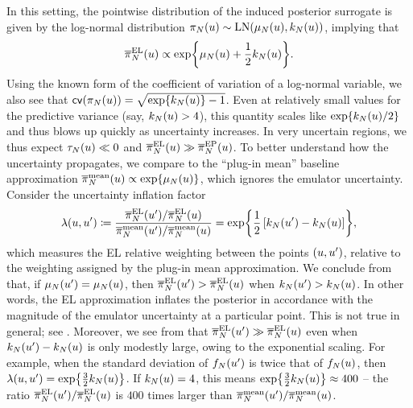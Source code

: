 \documentclass[12pt]{article}
\begin{document}
In this setting, the pointwise distribution of the induced posterior surrogate is given by the log-normal 
distribution $\pi_{N}(u) \sim \mathrm{LN}(\mu_{N}(u), k_{N}(u))$, implying that
\begin{equation}
\overline{\pi}_{N}^{\mathrm{EL}}(u) \propto \exp\mathopen{}\left\{\mu_{N}(u) + \frac{1}{2}k_{N}(u)\right\}\mathclose{}.
\label{eq:EL-Gaussian-fwd}
\end{equation} 
Using the known form of the coefficient of variation of a log-normal variable, we also see that
$\mathsf{cv}(\pi_{N}(u)) = \sqrt{\exp\mathopen{}\left\{k_{N}(u)\right\}\mathclose{} - 1}$. Even at relatively small values for the 
predictive variance (say, $k_{N}(u) > 4$), this quantity scales like $\exp\mathopen{}\left\{k_{N}(u)/2\right\}\mathclose{}$
and thus blows up quickly as uncertainty increases. In very uncertain regions, we thus expect
$\tau_{N}(u) \ll 0$ and $\overline{\pi}_{N}^{\mathrm{EL}}(u) \gg \overline{\pi}_{N}^{\mathrm{EP}}(u)$.
To better understand how the uncertainty propagates, we compare to the ``plug-in mean''
 baseline approximation $\overline{\pi}_{N}^{\mathrm{mean}}(u) \propto \exp\mathopen{}\left\{\mu_{N}(u)\right\}\mathclose{}$, 
 which ignores the emulator uncertainty. Consider the uncertainty inflation factor
 \begin{equation}
 \lambda(u, u^\prime) 
 \coloneqq \frac{\overline{\pi}_{N}^{\mathrm{EL}}(u^\prime)/\overline{\pi}_{N}^{\mathrm{EL}}(u)}{\overline{\pi}_{N}^{\mathrm{mean}}(u^\prime)/\overline{\pi}_{N}^{\mathrm{mean}}(u)}
 = \exp\mathopen{}\left\{\frac{1}{2}\left[k_{N}(u^\prime) - k_{N}(u) \right]\right\}\mathclose{},
 \label{eq:unc-infl-factor}
 \end{equation}
which measures the EL relative weighting between the points $(u, u^\prime)$, relative to the 
weighting assigned by the plug-in mean approximation. We conclude from 
that, if $\mu_{N}(u^\prime) = \mu_{N}(u)$, then $\overline{\pi}_{N}^{\mathrm{EL}}(u^\prime) > \overline{\pi}_{N}^{\mathrm{EL}}(u)$
when $k_{N}(u^\prime) > k_{N}(u)$. In other words, the EL approximation inflates the posterior
in accordance with the magnitude of the emulator uncertainty at a particular point. 
This is not true in general; see . Moreover, we see from  that
$\overline{\pi}_{N}^{\mathrm{EL}}(u^\prime) \gg \overline{\pi}_{N}^{\mathrm{EL}}(u)$ even when 
$k_{N}(u^\prime) - k_{N}(u)$ is only modestly large, owing to the exponential scaling. 
For example, when the standard deviation of $f_{N}(u^\prime)$ is twice that of $f_{N}(u)$,
then $\lambda(u, u^\prime) = \exp\mathopen{}\left\{\frac{3}{2}k_{N}(u)\right\}\mathclose{}$. If $k_{N}(u) = 4$, this means
$\exp\mathopen{}\left\{\frac{3}{2}k_{N}(u)\right\}\mathclose{} \approx 400$ -- the ratio $\overline{\pi}_{N}^{\mathrm{EL}}(u^\prime)/\overline{\pi}_{N}^{\mathrm{EL}}(u)$
is $400$ times larger than $\overline{\pi}_{N}^{\mathrm{mean}}(u^\prime)/\overline{\pi}_{N}^{\mathrm{mean}}(u)$.
\end{document}
